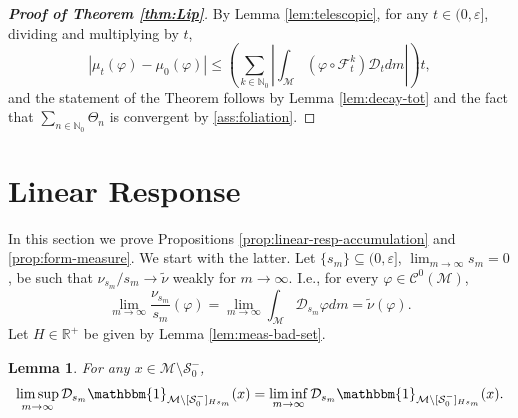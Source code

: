 \documentclass{amsart}
\numberwithin{equation}{section}
\newtheorem{lemma}[theorem]{Lemma}
\newcommand\ve{\varepsilon}
\newcommand\vf{\varphi}
\renewcommand{\le}{\leqslant}
\newcommand\cC{{\mathcal C}}
\newcommand\cF{{\mathcal F}}
\newcommand\cM{{\mathcal M}}
\newcommand\cS{{\mathcal S}}
\newcommand\bN{{\mathbb N}}
\newcommand\bR{{\mathbb R}}
\newcommand{\Deriv}{\mathcal D}
\begin{document}
\begin{proof}[\textbf{Proof of Theorem \ref{thm:Lip}}]
  By Lemma \ref{lem:telescopic}, for any \(t \in (0, \ve]\), dividing and multiplying by \(t\),
\[
    |\mu_t(\vf) - \mu_0(\vf)| \le \left(\sum_{k \in \bN_0} \left|\int_{\cM} (\vf \circ \cF_t^k) \Deriv_t dm\right|\right) t,
\]
and the statement of the Theorem follows by Lemma \ref{lem:decay-tot} and the fact that \(\sum_{n \in \bN_0}\Theta_n\) is convergent by \ref{ass:foliation}.
\end{proof}

\section{Linear Response} \label{sec:linear-response}

In this section we prove Propositions \ref{prop:linear-resp-accumulation} and \ref{prop:form-measure}. We start with the latter. Let \(\{s_m\} \subseteq (0, \ve]\), \(\lim_{m \to \infty}s_m = 0\), be such that \( \nu_{s_m}/s_m \to \widetilde \nu\) weakly for \(m \to \infty\). I.e., for every \(\vf \in \cC^0(\cM)\),
\begin{equation}\label{eq:weak-star-limit}
    \lim_{m \to \infty} \frac{\nu_{s_m}}{s_m}(\vf) = \lim_{m \to \infty} \int_{\cM} \Deriv_{s_m} \vf dm = \widetilde \nu (\vf).
\end{equation}
Let \(H \in \bR^+\) be given by Lemma \ref{lem:meas-bad-set}.
\begin{lemma}\label{lem:support2}
  For any \(x \in \cM \setminus \cS_0^-\),
  \[
    \limsup_{m \to \infty} \Deriv_{s_m}\mathbbm{1}_{\cM \setminus [\cS_0^-]_{Hs_m}}(x) =  \liminf_{m \to \infty} \Deriv_{s_m}\mathbbm{1}_{\cM \setminus [\cS_0^-]_{Hs_m}}(x).
  \]
\end{lemma}
\end{document}
